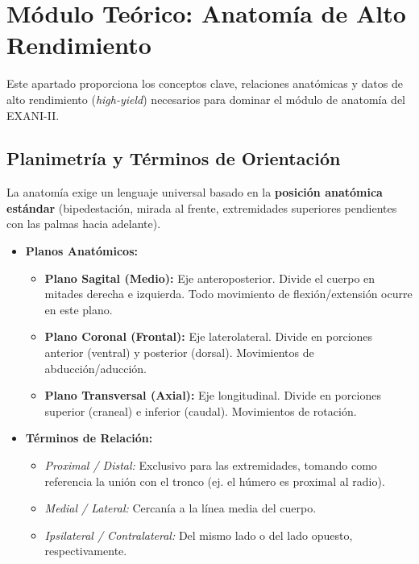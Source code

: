 \def\uadectitulo{Anatomía humana}



\portadaUAdeC

\section{Módulo Teórico: Anatomía de Alto Rendimiento}
Este apartado proporciona los conceptos clave, relaciones anatómicas y datos de alto rendimiento (\textit{high-yield}) necesarios para dominar el módulo de anatomía del EXANI-II.

\subsection{Planimetría y Términos de Orientación}
La anatomía exige un lenguaje universal basado en la \textbf{posición anatómica estándar} (bipedestación, mirada al frente, extremidades superiores pendientes con las palmas hacia adelante).
\begin{itemize}
    \item \textbf{Planos Anatómicos:}
    \begin{itemize}
        \item \textbf{Plano Sagital (Medio):} Eje anteroposterior. Divide el cuerpo en mitades derecha e izquierda. Todo movimiento de flexión/extensión ocurre en este plano.
        \item \textbf{Plano Coronal (Frontal):} Eje laterolateral. Divide en porciones anterior (ventral) y posterior (dorsal). Movimientos de abducción/aducción.
        \item \textbf{Plano Transversal (Axial):} Eje longitudinal. Divide en porciones superior (craneal) e inferior (caudal). Movimientos de rotación.
    \end{itemize}
    \item \textbf{Términos de Relación:} 
    \begin{itemize}
        \item \textit{Proximal / Distal:} Exclusivo para las extremidades, tomando como referencia la unión con el tronco (ej. el húmero es proximal al radio).
        \item \textit{Medial / Lateral:} Cercanía a la línea media del cuerpo.
        \item \textit{Ipsilateral / Contralateral:} Del mismo lado o del lado opuesto, respectivamente.
    \end{itemize}
\end{itemize}

